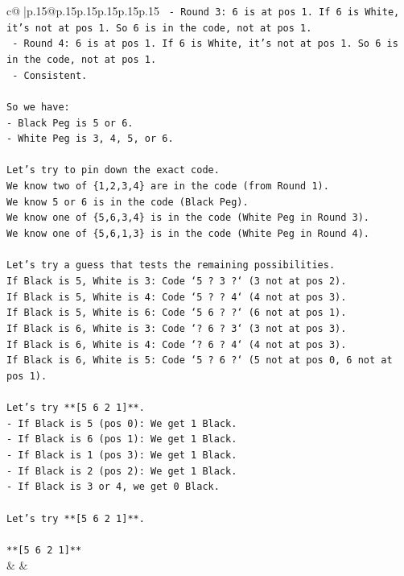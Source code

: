 \documentclass{article}
\begin{document}
{\begin{supertabular}{c@{$\;$}|p{.15\linewidth}@{}p{.15\linewidth}p{.15\linewidth}p{.15\linewidth}p{.15\linewidth}p{.15\linewidth}}
{{{\texttt{    {-} Round 3: 6 is at pos 1. If 6 is White, it's not at pos 1. So 6 is in the code, not at pos 1.} \\
\texttt{    {-} Round 4: 6 is at pos 1. If 6 is White, it's not at pos 1. So 6 is in the code, not at pos 1.} \\
\texttt{    {-} Consistent.} \\
\\ 
\texttt{So we have:} \\
\texttt{{-} Black Peg is 5 or 6.} \\
\texttt{{-} White Peg is 3, 4, 5, or 6.} \\
\\ 
\texttt{Let's try to pin down the exact code.} \\
\texttt{We know two of \{1,2,3,4\} are in the code (from Round 1).} \\
\texttt{We know 5 or 6 is in the code (Black Peg).} \\
\texttt{We know one of \{5,6,3,4\} is in the code (White Peg in Round 3).} \\
\texttt{We know one of \{5,6,1,3\} is in the code (White Peg in Round 4).} \\
\\ 
\texttt{Let's try a guess that tests the remaining possibilities.} \\
\texttt{If Black is 5, White is 3: Code `5 ? 3 ?` (3 not at pos 2).} \\
\texttt{If Black is 5, White is 4: Code `5 ? ? 4` (4 not at pos 3).} \\
\texttt{If Black is 5, White is 6: Code `5 6 ? ?` (6 not at pos 1).} \\
\texttt{If Black is 6, White is 3: Code `? 6 ? 3` (3 not at pos 3).} \\
\texttt{If Black is 6, White is 4: Code `? 6 ? 4` (4 not at pos 3).} \\
\texttt{If Black is 6, White is 5: Code `5 ? 6 ?` (5 not at pos 0, 6 not at pos 1).} \\
\\ 
\texttt{Let's try **{[}5 6 2 1{]}**.} \\
\texttt{{-} If Black is 5 (pos 0): We get 1 Black.} \\
\texttt{{-} If Black is 6 (pos 1): We get 1 Black.} \\
\texttt{{-} If Black is 1 (pos 3): We get 1 Black.} \\
\texttt{{-} If Black is 2 (pos 2): We get 1 Black.} \\
\texttt{{-} If Black is 3 or 4, we get 0 Black.} \\
\\ 
\texttt{Let's try **{[}5 6 2 1{]}**.} \\
\\ 
\texttt{**{[}5 6 2 1{]}**} \\
            }
        }
    }
    & & \\ \\


\end{supertabular}}
\end{document}
